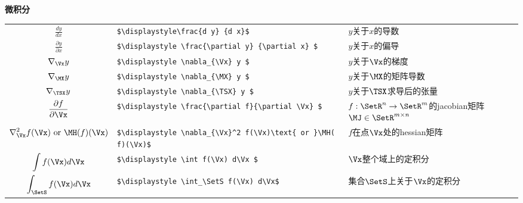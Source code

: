 \vspace{\notationgap}
\begin{minipage}{\textwidth}
\centerline{\bf 微积分}
\bgroup
\def\arraystretch{1.5}
\begin{tabular}{clp{3.25in}}
$\displaystyle\frac{d y} {d x}$ 								&\lstinline!$\displaystyle\frac{d y} {d x}$ 								!	&  $y$关于$x$的导数 \\
$\displaystyle \frac{\partial y} {\partial x} $ 				&\lstinline!$\displaystyle \frac{\partial y} {\partial x} $ 				!					&  $y$关于$x$的偏导 \\
$\displaystyle \nabla_{\Vx} y $ 								&\lstinline!$\displaystyle \nabla_{\Vx} y $ 								!	& $y$关于$\Vx$的梯度 \\
$\displaystyle \nabla_{\MX} y $ 								&\lstinline!$\displaystyle \nabla_{\MX} y $ 								!	& $y$关于$\MX$的矩阵导数 \\
$\displaystyle \nabla_{\TSX} y $ 								&\lstinline!$\displaystyle \nabla_{\TSX} y $ 								!	&  $y$关于$\TSX$求导后的张量 \\
$\displaystyle \frac{\partial f}{\partial \Vx} $ 				&\lstinline!$\displaystyle \frac{\partial f}{\partial \Vx} $ 				!					&$f: \SetR^n \rightarrow \SetR^m$的\gls{jacobian}矩阵$\MJ \in \SetR^{m\times n}$   \\
$\displaystyle \nabla_{\Vx}^2 f(\Vx)\text{ or }\MH( f)(\Vx)$ 	&\lstinline!$\displaystyle \nabla_{\Vx}^2 f(\Vx)\text{ or }\MH( f)(\Vx)$ 	!								&  $f$在点$\Vx$处的\gls{hessian}矩阵 \\
$\displaystyle \int f(\Vx) d\Vx $ 								&\lstinline!$\displaystyle \int f(\Vx) d\Vx $ 								!	& $\Vx$整个域上的定积分 \\
$\displaystyle \int_\SetS f(\Vx) d\Vx$ 							&\lstinline!$\displaystyle \int_\SetS f(\Vx) d\Vx$ 							!		& 集合$\SetS$上关于$\Vx$的定积分 \\
\end{tabular}
\egroup
\end{minipage}

